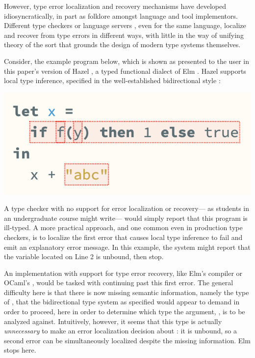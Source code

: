 However, type error localization and recovery mechanisms have developed idiosyncratically, 
in part as folklore amongst language and tool implementors. 
Different type checkers or language servers \cite{barros2022editing,bour2018merlin}, even for the same language, localize and recover from type errors in different ways, 
with little in the way of unifying theory of the sort that grounds the design of modern type systems themselves.

Consider, the example program below, which is shown as presented to the user in
this paper's version of Hazel \cite{hazel}, a typed functional dialect of Elm \cite{elm}. Hazel  
supports local type inference, specified in the well-established bidirectional style \cite{Localinf,HazelnutPOPL,BidirTyping}:
\vspace{-3px}
\begin{center}
    \includegraphics[scale=0.5]{images/hazel-intro-screenshot.png}
\end{center}
\vspace{-3px}
A type checker with no support for error localization or recovery---%
as students in an undergraduate course might write---%
would simply report that this program is ill-typed. 
A more practical approach, and one common even in production type checkers, 
is to localize the first error that causes local type inference to fail and emit an explanatory error message.
In this example, the system might report that the variable  located on Line 2 is unbound, then stop.

An implementation with support for type error recovery, like Elm's compiler or OCaml's  \cite{bour2018merlin}, would 
 be tasked with continuing past this first error.
 The general difficulty here is that there is now missing semantic information, namely the type of , that 
 the bidirectional type system as specified 
 would appear to demand in order to proceed, here in order to determine which type the argument, , is to be analyzed against.
 Intuitively, however, it seems that this type is actually \emph{unnecessary} to make an error localization decision about : 
it is unbound, so a second error can be simultaneously localized despite the missing information. Elm stops here.

